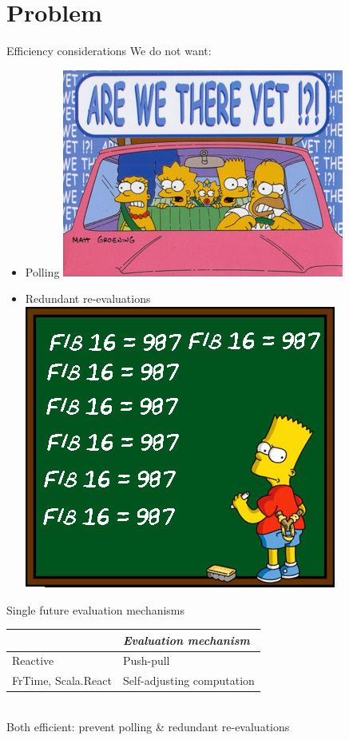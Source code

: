 \documentclass{beamer}
\begin{document}
\section{Problem}
\begin{frame}{Efficiency considerations}
We do not want:

\begin{itemize}
\item Polling \hfill\includegraphics[scale=0.3]{are-we-there-yet.jpg}
\item Redundant re-evaluations\hfill\includegraphics[scale=0.3]{recompute.png}
\end{itemize}

\end{frame}

\begin{frame}{Single future evaluation mechanisms}

\begin{tabular}{l l}
&\emph{Evaluation mechanism} \\
\hline
Reactive & Push-pull \\
FrTime, Scala.React & Self-adjusting computation \\
\end{tabular}\\
\vspace{0.2cm}
Both efficient: prevent polling \& redundant re-evaluations
\end{frame}
\end{document}
